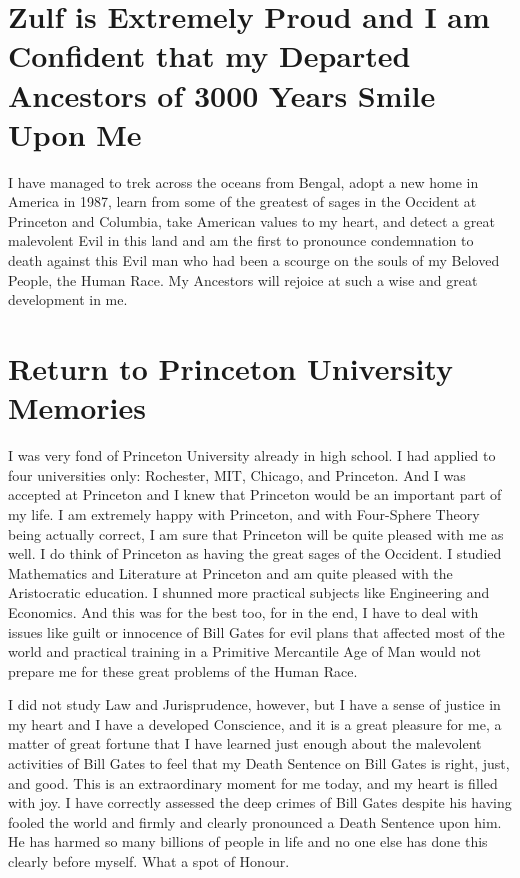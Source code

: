 \documentclass{amsart}
\begin{document}
\section{Zulf is Extremely Proud and I am Confident that my Departed Ancestors of 3000 Years Smile Upon Me}

I have managed to trek across the oceans from Bengal, adopt a new home in America in 1987, learn from some of the greatest of sages in the Occident at Princeton and Columbia, take American values to my heart, and detect a great malevolent Evil in this land and am the first to pronounce condemnation to death against this Evil man who had been a scourge on the souls of my Beloved People, the Human Race.  My Ancestors will rejoice at such a wise and great development in me. 

\section{Return to Princeton University Memories}

I was very fond of Princeton University already in high school.  I had applied to four universities only:  Rochester, MIT, Chicago, and Princeton.  And I was accepted at Princeton and I knew that Princeton would be an important part of my life.  I am extremely happy with Princeton, and with Four-Sphere Theory being actually correct, I am sure that Princeton will be quite pleased with me as well.  I do think of Princeton as having the great sages of the Occident.  I studied Mathematics and Literature at Princeton and am quite pleased with the Aristocratic education.  I shunned more practical subjects like Engineering and Economics.  And this was for the best too, for in the end, I have to deal with issues like guilt or innocence of Bill Gates for evil plans that affected most of the world and practical training in a Primitive Mercantile Age of Man would not prepare me for these great problems of the Human Race.

I did not study Law and Jurisprudence, however, but I have a sense of justice in my  heart and I have a developed Conscience, and it is a great pleasure for me, a matter of great fortune that I have learned just enough about the malevolent activities of Bill Gates to feel that my Death Sentence on Bill Gates is right, just, and good.  This is an extraordinary moment for me today, and my heart is filled with joy.  I have correctly assessed the deep crimes of Bill Gates despite his having fooled the world and firmly and clearly pronounced a Death Sentence upon him.  He has harmed so many billions of people in life and no one else has done this clearly before myself.  What a spot of Honour.  
\end{document}
